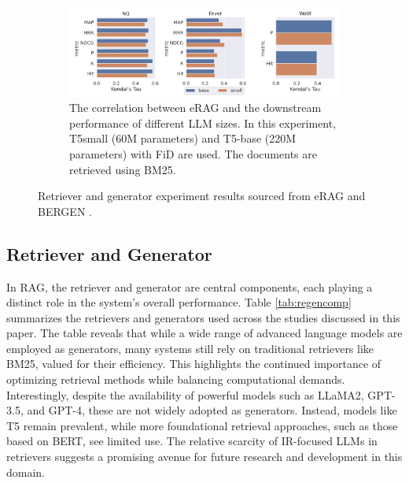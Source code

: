 \begin{figure}
	\begin{subfigure}[b]{\linewidth}
		\centering
		\includegraphics[width=0.9\linewidth]{Figures/RAG_gensize02.png}
		\caption{The correlation between eRAG and the downstream performance of different LLM sizes. In this experiment, T5small (60M parameters) and T5-base (220M parameters) with FiD are used. The documents are retrieved using BM25.}
		\label{fig:regencomp03}
	\end{subfigure}
	
	\caption{Retriever and generator experiment results sourced from eRAG \cite{salemi2024evaluating} and BERGEN \cite{rau2024bergen}.}
	\label{fig:regencomp}
\end{figure}

\subsection{Retriever and Generator}
In RAG, the retriever and generator are central components, each playing a distinct role in the system's overall performance. Table \ref{tab:regencomp} summarizes the retrievers and generators used across the studies discussed in this paper. The table reveals that while a wide range of advanced language models are employed as generators, many systems still rely on traditional retrievers like BM25, valued for their efficiency. This highlights the continued importance of optimizing retrieval methods while balancing computational demands. Interestingly, despite the availability of powerful models such as LLaMA2, GPT-3.5, and GPT-4, these are not widely adopted as generators. Instead, models like T5 remain prevalent, while more foundational retrieval approaches, such as those based on BERT, see limited use. The relative scarcity of IR-focused LLMs in retrievers suggests a promising avenue for future research and development in this domain.

